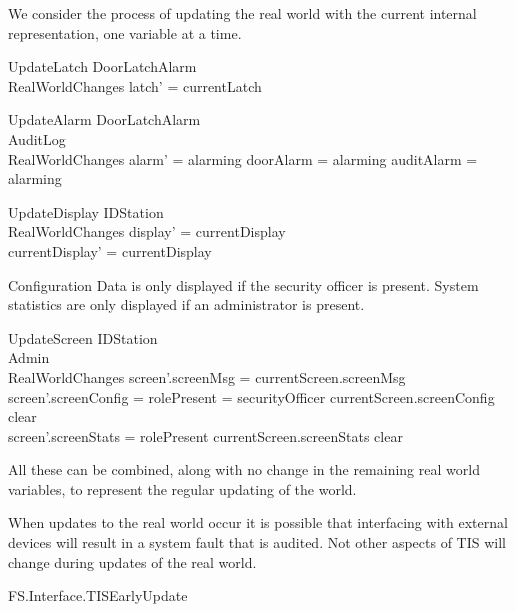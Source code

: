 We consider the process of updating the real world with the current
internal 
representation, one variable at a time.

\begin{schema}{UpdateLatch}
	\Xi DoorLatchAlarm
\\	RealWorldChanges
\where
	latch' = currentLatch
\end{schema}

\begin{schema}{UpdateAlarm}
	\Xi DoorLatchAlarm
\\      AuditLog
\\	RealWorldChanges
\where
        alarm' = alarming \iff doorAlarm = alarming \lor auditAlarm = alarming 
\end{schema}

\begin{schema}{UpdateDisplay}
	\Delta IDStation
\\	RealWorldChanges
\where
	display' = currentDisplay
\\      currentDisplay' = currentDisplay
\end{schema}

Configuration Data is only displayed if the security officer is
present.  System statistics are only displayed if an administrator is present.

\begin{schema}{UpdateScreen}
        \Delta IDStation
\\      \Xi Admin
\\      RealWorldChanges
\where
           screen'.screenMsg = currentScreen.screenMsg
\\           screen'.screenConfig = \IF \The rolePresent =
securityOfficer \THEN currentScreen.screenConfig \ELSE clear 
\\            screen'.screenStats = \IF rolePresent \neq \Nil
\THEN currentScreen.screenStats \ELSE clear
\end{schema}

All these can be combined, along with no change in the remaining
real world variables,
to represent the regular updating of the world. 
 
When updates to the real world occur it is possible that interfacing
with external devices will result in a system fault that is
audited. Not other aspects of TIS will change during updates of the
real world.

\begin{traceunit}{FS.Interface.TISEarlyUpdate}
\end{traceunit}


